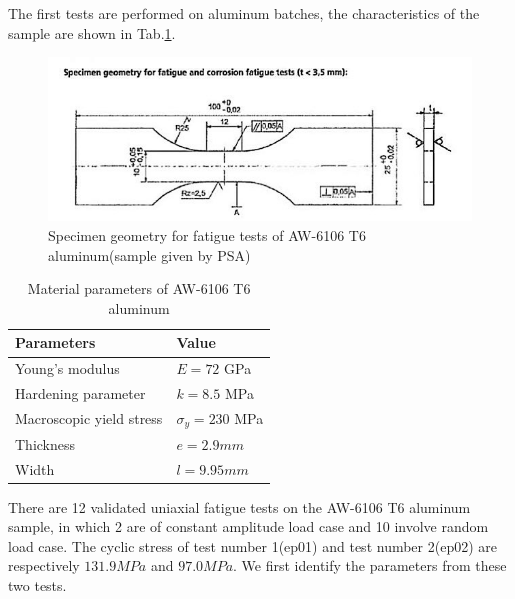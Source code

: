 \documentclass[3p,times,procedia,number]{elsarticle}
\begin{document}
The first tests are performed on aluminum batches, the characteristics of the sample are shown in Tab.\ref{tab:cetim}.
\begin{figure}[!h]
	\centering
	\includegraphics[width=\textwidth]{figures//aluminum_cetim.png} 
	\caption{Specimen geometry for fatigue tests of AW-6106 T6 aluminum(sample given by PSA)}
	\label{fig:aluminum}
\end{figure}
\begin{table}[!h]
	\centering
	\begin{tabular}{ll}
		\hline
		\textbf{Parameters}                                         & \textbf{Value}                    \\ \hline
		Young's modulus                                             & $E=72$ GPa                       \\
		Hardening parameter                                         &  $k=8.5$ MPa \\
		Macroscopic yield stress                                    & $\sigma_y=230$ MPa              \\
		Thickness & $e=2.9mm$                        \\
		Width		 & $l= 9.95mm$                        \\ \hline
	\end{tabular}
	\caption{Material parameters of AW-6106 T6 aluminum}
	\label{tab:cetim}
\end{table}

There are 12 validated uniaxial fatigue tests on the AW-6106 T6 aluminum sample, in which 2 are of constant amplitude load case and 10 involve random  load case. 
The cyclic stress of test number 1(ep01) and test number 2(ep02) are respectively $131.9MPa$ and $97.0MPa$. We first identify the parameters from these two tests. 
\end{document}
